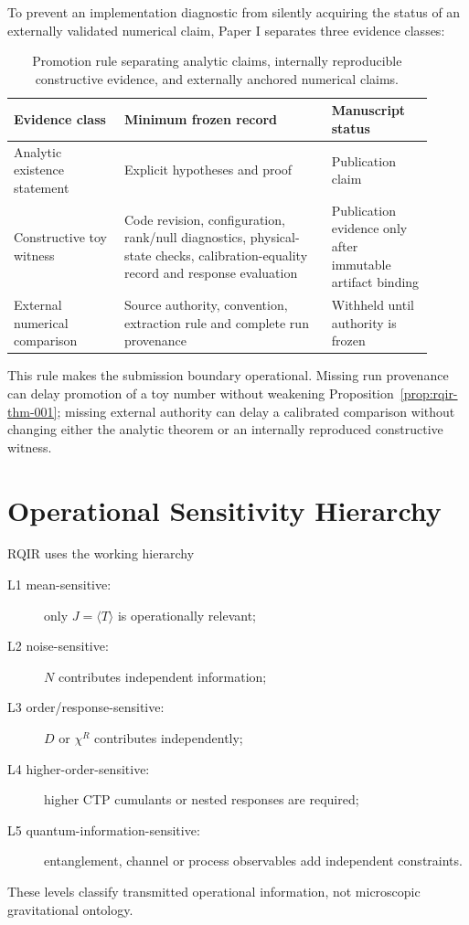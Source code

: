 \documentclass[11pt]{article}
\begin{document}
To prevent an implementation diagnostic from silently acquiring the status of an externally validated numerical claim, Paper I separates three evidence classes:
\begin{table}[ht]
\centering
\small
\begin{tabular}{@{}p{0.24\linewidth}p{0.45\linewidth}p{0.22\linewidth}@{}}
\toprule
Evidence class & Minimum frozen record & Manuscript status \\
\midrule
Analytic existence statement & Explicit hypotheses and proof & Publication claim \\
Constructive toy witness & Code revision, configuration, rank/null diagnostics, physical-state checks, calibration-equality record and response evaluation & Publication evidence only after immutable artifact binding \\
External numerical comparison & Source authority, convention, extraction rule and complete run provenance & Withheld until authority is frozen \\
\bottomrule
\end{tabular}
\caption{Promotion rule separating analytic claims, internally reproducible constructive evidence, and externally anchored numerical claims.}
\label{tab:evidence-promotion}
\end{table}

This rule makes the submission boundary operational. Missing run provenance can delay promotion of a toy number without weakening Proposition~\ref{prop:rqir-thm-001}; missing external authority can delay a calibrated comparison without changing either the analytic theorem or an internally reproduced constructive witness.

\section{Operational Sensitivity Hierarchy}

RQIR uses the working hierarchy
\begin{description}
 \item[L1 mean-sensitive:] only $J=\langle T\rangle$ is operationally relevant;
 \item[L2 noise-sensitive:] $N$ contributes independent information;
 \item[L3 order/response-sensitive:] $D$ or $\chi^R$ contributes independently;
 \item[L4 higher-order-sensitive:] higher CTP cumulants or nested responses are required;
 \item[L5 quantum-information-sensitive:] entanglement, channel or process observables add independent constraints.
\end{description}
These levels classify transmitted operational information, not microscopic gravitational ontology.
\end{document}
